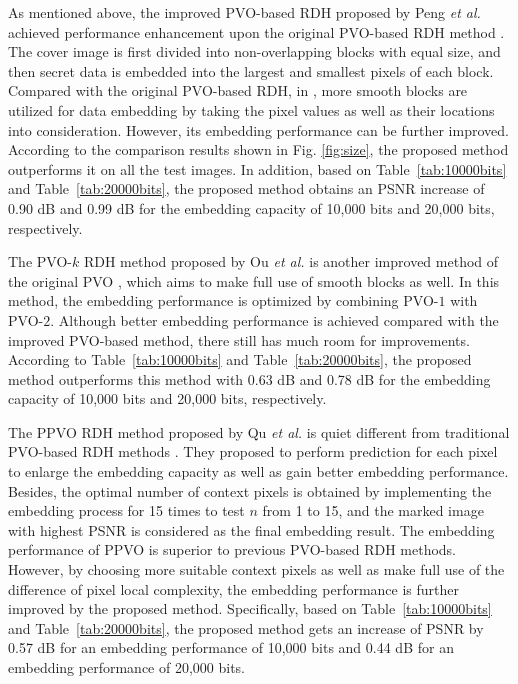 \documentclass[review,3p,10pt,sort&compress]{elsarticle}
\begin{document}
As mentioned above, the improved PVO-based RDH proposed by Peng \emph{et al.} \cite{Peng2014IPVO} achieved performance enhancement upon the original PVO-based RDH method \cite{Li2013PVO}. The cover image is first divided into non-overlapping blocks with equal size, and then secret data is embedded into the largest and smallest pixels of each block. Compared with the original PVO-based RDH, in \cite{Peng2014IPVO}, more smooth blocks are utilized for data embedding by taking the pixel values as well as their locations into consideration. However, its embedding performance can be further improved. According to the comparison results shown in Fig. \ref{fig:size}, the proposed method outperforms it on all the test images. In addition, based on Table~\ref{tab:10000bits} and Table~\ref{tab:20000bits}, the proposed method obtains an PSNR increase of 0.90 dB and 0.99 dB for the embedding capacity of 10,000 bits and 20,000 bits, respectively.

The PVO-$k$ RDH method proposed by Ou \emph{et al.} \cite{Qu2015PPVO} is another improved method of the original PVO \cite{Li2013PVO}, which aims to make full use of smooth blocks as well. In this method, the embedding performance is optimized by combining PVO-$1$ with PVO-$2$. Although better embedding performance is achieved compared with the improved PVO-based method, there still has much room for improvements. According to Table~\ref{tab:10000bits} and Table~\ref{tab:20000bits}, the proposed method outperforms this method with 0.63 dB and 0.78 dB for the embedding capacity of 10,000 bits and 20,000 bits, respectively.

The PPVO RDH method proposed by Qu \emph{et al.} \cite{Qu2015PPVO} is quiet different from traditional PVO-based RDH methods \cite{Li2013PVO,Peng2014IPVO,Ou2014PVOk}. They proposed to perform prediction for each pixel to enlarge the embedding capacity as well as gain better embedding performance. Besides, the optimal number of context pixels is obtained by implementing the embedding process for 15 times to test $n$ from 1 to 15, and the marked image with highest PSNR is considered as the final embedding result. The embedding performance of PPVO is superior to previous PVO-based RDH methods. However, by choosing more suitable context pixels as well as make full use of the difference of pixel local complexity, the embedding performance is further improved by the proposed method. Specifically, based on Table~\ref{tab:10000bits} and Table~\ref{tab:20000bits}, the proposed method gets an increase of PSNR by 0.57 dB for an embedding performance of 10,000 bits and 0.44 dB for an embedding performance of 20,000 bits.
\end{document}
